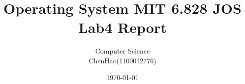 \documentclass[GBK,winfonts,a4paper,10pt]{ctexart}
\begin{document}
\rhead{}
\lhead{}
\cfoot{\thepage}
\renewcommand{\footrulewidth}{0.4pt}
\renewcommand{\algorithmicrequire}{\textbf{Input:}}
\renewcommand{\algorithmicensure}{\textbf{Output:}}
\setlength{\tabcolsep}{2pt}

\setlength{\parindent}{2em}

\thispagestyle{fancy}


\title{Operating System MIT 6.828 JOS Lab4 Report}
\author{Computer Science \\ ChenHao(1100012776) }
\date{\today}
\maketitle

\thispagestyle{fancy}

\tableofcontents

\newpage
\end{document}
